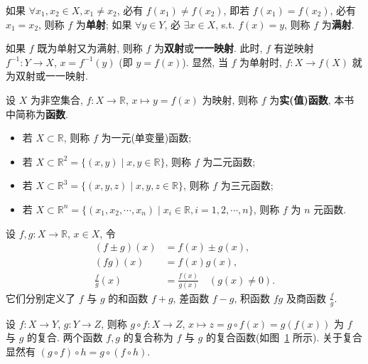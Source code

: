 如果 $\forall x_{1}, x_{2} \in X, x_{1} \neq x_{2}$, 必有 $f(x_{1}) \neq f(x_{2})$, 即若 $f(x_{1})=f(x_{2})$, 必有 $x_{1}=x_{2}$, 则称 $f$ 为\textbf{单射}; 如果 $\forall y\in Y$, 必 $\exists x\in X$, s.t. $f(x)=y$, 则称 $f$ 为\textbf{满射}.

如果 $f$ 既为单射又为满射, 则称 $f$ 为\textbf{双射}或\textbf{一一映射}. 此时, $f$ 有逆映射 $f^{-1}\colon Y \to X$, $x = f^{-1}(y)$ (即 $y = f(x)$). 显然, 当 $f$ 为单射时, $f\colon X \to f(X)$ 就为双射或一一映射.

设 $X$ 为非空集合, $f\colon X \to \mathbb{R}$, $x \mapsto y = f(x)$ 为映射, 则称 $f$ 为\textbf{实(值)函数}, 本书中简称为\textbf{函数}.
\begin{itemize}
  \item 若 $X \subset \mathbb{R}$, 则称 $f$ 为一元(单变量)函数;
  \item 若 $X \subset \mathbb{R}^{2} = \{(x, y) \mid x, y \in \mathbb{R}\}$, 则称 $f$ 为二元函数;
  \item 若 $X \subset \mathbb{R}^{3} = \{(x, y, z) \mid x, y, z \in \mathbb{R}\}$, 则称 $f$ 为三元函数;
  \item 若 $X \subset \mathbb{R}^{n} = \{(x_{1}, x_{2}, \cdots, x_{n}) \mid x_{i} \in \mathbb{R}, i=1,2,\cdots,n\}$, 则称 $f$ 为 $n$ 元函数.
\end{itemize}

设 $f, g\colon X \to \mathbb{R}$, $x \in X$, 令
\begin{align*}
(f\pm g)(x) &= f(x)\pm g(x), \\
(fg)(x) &= f(x)g(x), \\
\frac{f}{g}(x) &= \frac{f(x)}{g(x)}\quad (g(x)\neq 0).
\end{align*}
它们分别定义了 $f$ 与 $g$ 的和函数 $f + g$, 差函数 $f - g$, 积函数 $fg$ 及商函数 $\frac{f}{g}$.

设 $f\colon X \to Y$, $g\colon Y \to Z$, 则称 $g \circ f\colon X \to Z$, $x \mapsto z = g \circ f(x) = g(f(x))$ 为 $f$ 与 $g$ 的复合. 两个函数 $f, g$ 的复合称为 $f$ 与 $g$ 的复合函数(如图~\ref{fig:2.1.2} 所示). 关于复合显然有 $(g \circ f) \circ h = g \circ (f \circ h)$.

\begin{figure}[htbp]
\centering
{}
\caption{}\label{fig:2.1.2}
\end{figure}

